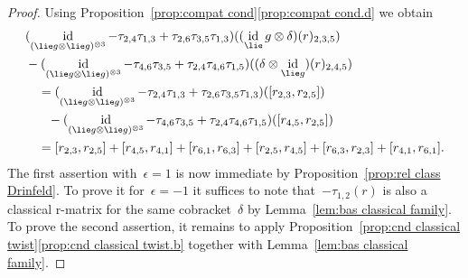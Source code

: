 \documentclass[12pt, reqno]{amsart}
\theoremstyle{definition}
\numberwithin{equation}{section}
\newcommand{\tensor}{\otimes}
\DeclareMathOperator{\id}{id}
\begin{document}
\begin{proof}
Using Proposition~\ref{prop:compat cond}\ref{prop:compat cond.d} we obtain
\begin{align*}
&(\id_{(\lie g\tensor \lie g)^{\tensor3}}-\tau_{2,4}\tau_{1,3}+\tau_{2,6}\tau_{3,5}\tau_{1,3})((\id_\lie g\tensor\delta)(r)_{2,3,5})\\&-
(\id_{(\lie g\tensor \lie g)^{\tensor3}}-\tau_{4,6}\tau_{3,5}+\tau_{2,4}\tau_{4,6}\tau_{1,5})((\delta\tensor \id_{\lie g})(r)_{2,4,5})\\
&\quad = (\id_{(\lie g\tensor \lie g)^{\tensor3}}-\tau_{2,4}\tau_{1,3}+\tau_{2,6}\tau_{3,5}\tau_{1,3})([r_{2,3},r_{2,5}])\\
&\quad\phantom{=}-(\id_{(\lie g\tensor \lie g)^{\tensor3}}-\tau_{4,6}\tau_{3,5}+\tau_{2,4}\tau_{4,6}\tau_{1,5})([r_{4,5},r_{2,5}])\\
&\quad = [r_{2,3},r_{2,5}]+[r_{4,5},r_{4,1}]
+[r_{6,1},r_{6,3}]
+[r_{2,5},r_{4,5}]+
[r_{6,3},r_{2,3}]+[r_{4,1},r_{6,1}].
\end{align*}
The first assertion with~$\epsilon=1$ is now immediate by Proposition~\ref{prop:rel class Drinfeld}. To prove it for~$\epsilon=-1$ it suffices to note that~$-\tau_{1,2}(r)$
is also a classical r-matrix for the same cobracket~$\delta$ by Lemma~\ref{lem:bas classical family}.
To prove the second assertion, it remains to apply Proposition~\ref{prop:cnd classical twist}\ref{prop:cnd classical twist.b} together with Lemma~\ref{lem:bas classical family}.
\end{proof}
\end{document}
